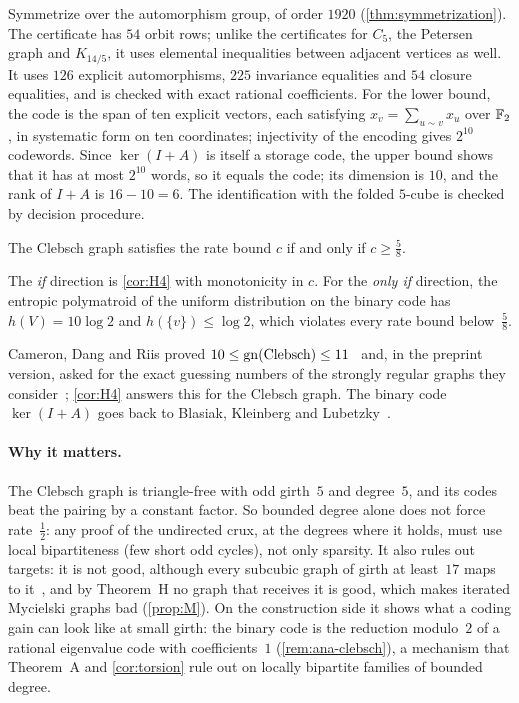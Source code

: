 \begin{outline}
Symmetrize over the automorphism group, of order $1920$ (\cref{thm:symmetrization}). The certificate has $54$ orbit rows;
unlike the certificates for $C_5$, the Petersen graph and $K_{14/5}$, it uses elemental inequalities between adjacent
vertices as well. It uses $126$ explicit
automorphisms, $225$ invariance equalities and $54$ closure equalities, and is checked with exact rational coefficients.
For the lower bound, the code is the span of ten explicit vectors, each satisfying $x_v=\sum_{u\sim v}x_u$ over
$\mathbb{F}_2$, in systematic form on ten coordinates; injectivity of the encoding gives $2^{10}$ codewords. Since $\ker(I+A)$ is itself a storage code, the upper bound shows that
it has at most $2^{10}$ words, so it equals the code; its dimension is $10$, and the rank of $I+A$ is $16-10=6$. The
identification with the folded $5$-cube is checked by decision procedure.
\end{outline}

\begin{proposition}\label{prop:clebsch-exact}
The Clebsch graph satisfies the rate bound $c$ if and only if $c\ge\tfrac58$.
\end{proposition}

\begin{outline}
The \emph{if} direction is \cref{cor:H4} with monotonicity in $c$. For the \emph{only if} direction, the entropic
polymatroid of the uniform distribution on the binary code has $h(V)=10\log2$ and $h(\{v\})\le\log2$, which violates
every rate bound below~$\tfrac58$.
\end{outline}

Cameron, Dang and Riis proved $10\le\mathrm{gn}(\text{Clebsch})\le11$~\cite{CameronDangRiis2016} and, in the preprint
version, asked for the exact guessing numbers of the strongly regular graphs they consider~\cite[Problem~5.11]{CameronDangRiis2014};
\cref{cor:H4} answers this for the Clebsch graph. The binary code $\ker(I+A)$ goes back to Blasiak,
Kleinberg and Lubetzky~\cite{BKL2013}.

\paragraph{Why it matters.} The Clebsch graph is triangle-free with odd girth~$5$ and degree~$5$, and its codes beat the
pairing by a constant factor. So bounded degree alone does not force rate~$\tfrac12$: any proof of the undirected crux,
at the degrees where it holds, must use local bipartiteness (few short odd cycles), not only sparsity. It also rules out
targets: it is not good, although every subcubic graph of girth at least~$17$ maps to it~\cite{DeVosSamal2006}, and
by Theorem~H no graph that receives it is good, which makes iterated Mycielski graphs bad (\cref{prop:M}). On the
construction side it shows what a coding gain can look like
at small girth: the binary code is the reduction modulo~$2$ of a rational eigenvalue code with coefficients~$1$
(\cref{rem:ana-clebsch}), a mechanism that Theorem~A and \cref{cor:torsion} rule out on locally bipartite families of
bounded degree.

